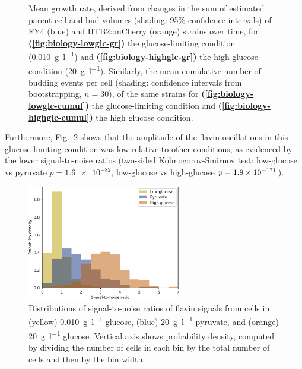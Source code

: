 \begin{figure}[htbp!]
  \caption[
    Mean growth rate, derived from changes in the sum of estimated parent cell and bud volumes
    of FY4 and HTB2::mCherry strains over time during the glucose-starvation experiment, for
    the glucose-limiting condition and
    the high glucose condition.
    Similarly, the mean cumulative number of budding events per cell.
  ]{
    Mean growth rate, derived from changes in the sum of estimated parent cell and bud volumes (shading: 95\% confidence intervals) of FY4 (blue) and HTB2::mCherry (orange) strains over time, for \textbf{(\ref{fig:biology-lowglc-gr})} the glucose-limiting condition (\SI{0.010}{\gram~\litre^{-1}}) and \textbf{(\ref{fig:biology-highglc-gr})} the high glucose condition (\SI{20}{\gram~\litre^{-1}}).
    Similarly, the mean cumulative number of budding events per cell (shading: confidence intervals from bootstrapping, $n=30$), of the same strains for \textbf{(\ref{fig:biology-lowglc-cumul})} the glucose-limiting condition and \textbf{(\ref{fig:biology-highglc-cumul})} the high glucose condition.
  }
  \label{fig:biology-lowglc-gr-budprob}
\end{figure}

Furthermore, Fig.\ \ref{fig:biology-compare-snr} shows that the amplitude of the flavin oscillations in this glucose-limiting condition was low relative to other conditions, as evidenced by the lower signal-to-noise ratios (two-sided Kolmogorov-Smirnov test: low-glucose vs pyruvate $p = \num{1.6e-82}$, low-glucose vs high-glucose $p = \num{1.9d-171}$).

\begin{figure}[htbp!]
  \centering
  \includegraphics[width=0.6\textwidth]{csource_snrs_edit}

  \caption[
    Distributions of signal-to-noise ratios of flavin signals from cells in
    \SI{0.010}{\gram~\litre^{-1}} glucose,
    \SI{20}{\gram~\litre^{-1}} pyruvate, and
    \SI{20}{\gram~\litre^{-1}} glucose.
  ]{
    Distributions of signal-to-noise ratios of flavin signals from cells in
    (yellow) \SI{0.010}{\gram~\litre^{-1}} glucose,
    (blue) \SI{20}{\gram~\litre^{-1}} pyruvate, and
    (orange) \SI{20}{\gram~\litre^{-1}} glucose.
    Vertical axis shows probability density, computed by dividing the number of cells in each bin by the total number of cells and then by the bin width.
  }
  \label{fig:biology-compare-snr}
\end{figure}

